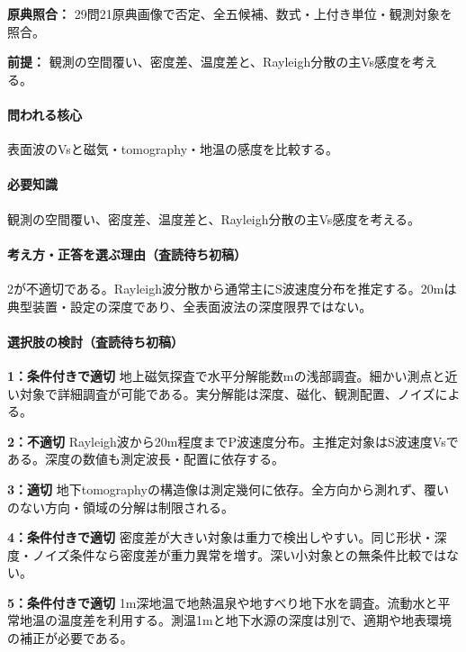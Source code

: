 \noindent\textbf{原典照合：} 29問21原典画像で否定、全五候補、数式・上付き単位・観測対象を照合。\par

\noindent\textbf{前提：} 観測の空間覆い、密度差、温度差と、Rayleigh分散の主Vs感度を考える。\par

\paragraph{問われる核心} 表面波のVsと磁気・tomography・地温の感度を比較する。

\paragraph{必要知識} 観測の空間覆い、密度差、温度差と、Rayleigh分散の主Vs感度を考える。

\paragraph{考え方・正答を選ぶ理由（査読待ち初稿）} 2が不適切である。Rayleigh波分散から通常主にS波速度分布を推定する。20mは典型装置・設定の深度であり、全表面波法の深度限界ではない。

\paragraph{選択肢の検討（査読待ち初稿）}\mbox{}\par

\noindent\textbf{1：条件付きで適切} 地上磁気探査で水平分解能数mの浅部調査。細かい測点と近い対象で詳細調査が可能である。実分解能は深度、磁化、観測配置、ノイズによる。\par

\noindent\textbf{2：不適切} Rayleigh波から20m程度までP波速度分布。主推定対象はS波速度Vsである。深度の数値も測定波長・配置に依存する。\par

\noindent\textbf{3：適切} 地下tomographyの構造像は測定幾何に依存。全方向から測れず、覆いのない方向・領域の分解は制限される。\par

\noindent\textbf{4：条件付きで適切} 密度差が大きい対象は重力で検出しやすい。同じ形状・深度・ノイズ条件なら密度差が重力異常を増す。深い小対象との無条件比較ではない。\par

\noindent\textbf{5：条件付きで適切} 1m深地温で地熱温泉や地すべり地下水を調査。流動水と平常地温の温度差を利用する。測温1mと地下水源の深度は別で、適期や地表環境の補正が必要である。\par

